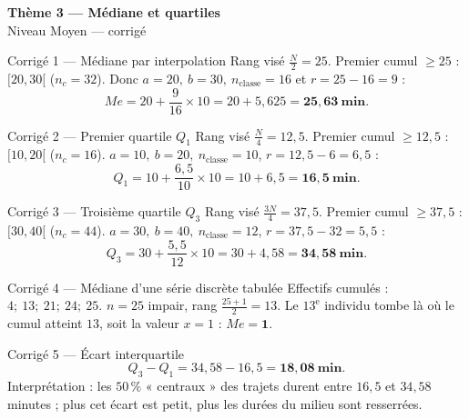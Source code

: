 \documentclass[11pt,a4paper]{article}
\newcommand{\bandeau}[2]{%
\begin{tcolorbox}[boxbase,colback=primary,colframe=primarydark,halign=center,
   before skip=2pt,after skip=12pt]
{\LARGE\bfseries\color{white} #1}\\[3pt]{\normalsize\color{white} #2}
\end{tcolorbox}}
\newcommand{\med}{M\!e}
\begin{document}
\bandeau{Thème 3 — Médiane et quartiles}{Niveau Moyen — corrigé}

\begin{corbox}{Corrigé 1 — Médiane par interpolation}
Rang visé $\tfrac{N}{2}=25$. Premier cumul $\geqslant25$ : $[20,30[$ ($n_c=32$).
Donc $a=20,\ b=30,\ n_{\text{classe}}=16$ et $r=25-16=9$ :
\[ \med=20+\frac{9}{16}\times10=20+5{,}625=\mathbf{25{,}63\ \text{min}}. \]
\end{corbox}

\begin{corbox}{Corrigé 2 — Premier quartile $Q_1$}
Rang visé $\tfrac{N}{4}=12{,}5$. Premier cumul $\geqslant12{,}5$ : $[10,20[$ ($n_c=16$).
$a=10,\ b=20,\ n_{\text{classe}}=10$, $r=12{,}5-6=6{,}5$ :
\[ Q_1=10+\frac{6{,}5}{10}\times10=10+6{,}5=\mathbf{16{,}5\ \text{min}}. \]
\end{corbox}

\begin{corbox}{Corrigé 3 — Troisième quartile $Q_3$}
Rang visé $\tfrac{3N}{4}=37{,}5$. Premier cumul $\geqslant37{,}5$ : $[30,40[$ ($n_c=44$).
$a=30,\ b=40,\ n_{\text{classe}}=12$, $r=37{,}5-32=5{,}5$ :
\[ Q_3=30+\frac{5{,}5}{12}\times10=30+4{,}58=\mathbf{34{,}58\ \text{min}}. \]
\end{corbox}

\begin{corbox}{Corrigé 4 — Médiane d'une série discrète tabulée}
Effectifs cumulés : $4;\ 13;\ 21;\ 24;\ 25$. $n=25$ impair, rang $\tfrac{25+1}{2}=13$.
Le $13^{\text{e}}$ individu tombe là où le cumul atteint $13$, soit la valeur $x=1$ :
$\med=\mathbf{1}$.
\end{corbox}

\begin{corbox}{Corrigé 5 — Écart interquartile}
\[ Q_3-Q_1=34{,}58-16{,}5=\mathbf{18{,}08\ \text{min}}. \]
Interprétation : les $50\,\%$ « centraux » des trajets durent entre $16{,}5$ et $34{,}58$ minutes ;
plus cet écart est petit, plus les durées du milieu sont resserrées.
\end{corbox}
\end{document}
